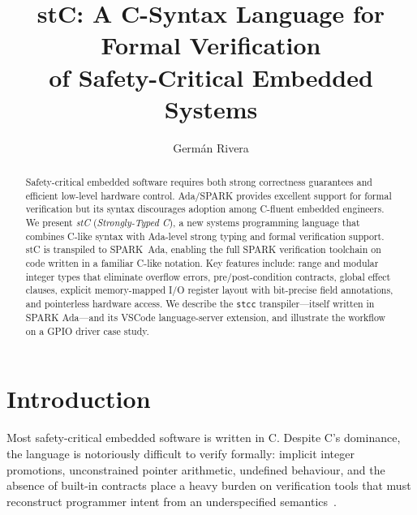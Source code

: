 \documentclass[runningheads]{llncs}
\begin{document}
\title{stC: A C-Syntax Language for Formal Verification\\of Safety-Critical Embedded Systems}

\author{Germ\'an Rivera}



\maketitle

\begin{abstract}
Safety-critical embedded software requires both strong correctness guarantees and
efficient low-level hardware control. Ada/SPARK provides excellent support for
formal verification but its syntax discourages adoption among C-fluent embedded
engineers. We present \emph{stC} (\emph{Strongly-Typed C}), a new systems programming
language that combines C-like syntax with Ada-level strong typing and formal
verification support. stC is transpiled to SPARK~Ada, enabling the full
SPARK verification toolchain on code written in a familiar C-like notation.
Key features include: range and modular integer types that eliminate overflow
errors, pre/post-condition contracts, global effect clauses, explicit
memory-mapped I/O register layout with bit-precise field annotations,
and pointerless hardware access. We describe the \texttt{stcc} transpiler---itself
written in SPARK Ada---and its VSCode language-server extension, and
illustrate the workflow on a GPIO driver case study.
\end{abstract}


\section{Introduction}
\label{sec:intro}

Most safety-critical embedded software is written in C. Despite C's dominance, the
language is notoriously difficult to verify formally: implicit integer promotions,
unconstrained pointer arithmetic, undefined behaviour, and the absence of built-in
contracts place a heavy burden on verification tools that must reconstruct
programmer intent from an underspecified semantics~\cite{misra-c}.
\end{document}
